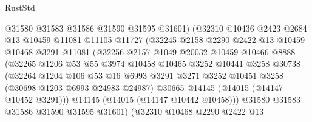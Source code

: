 \begin{lexlean}{RustStd}
\begin{coremodule}
                          @31580
                          @31583
                          @31586
                          @31590
                          @31595
                          @31601)
                        (@32310
                          @10436
                          @2423
                          @2684
                          @13
                          @10459
                          @11081
                          @11105
                          @11727
                          (@32245
                            @2158
                            @2290
                            @2422
                            @13
                            @10459
                            @10468
                            @3291
                            @11081
                            (@32256
                              @2157
                              @1049
                              @20032
                              @10459
                              @10466
                              @8888
                              (@32265
                                @1206
                                @53
                                @55
                                @3974
                                @10458
                                @10465
                                @3252
                                @10441
                                @3258
                                @30738
                                (@32264
                                  @1204
                                  @106
                                  @53
                                  @16
                                  @6993
                                  @3291
                                  @3271
                                  @3252
                                  @10451
                                  @3258
                                  (@30698 @1203 @6993 @24983 @24987)
                                  @30665
                                  @14145
                                  (@14015 (@14147 @10452 @3291)))
                                @14145
                                (@14015 (@14147 @10442 @10458)))
                              @31580
                              @31583
                              @31586
                              @31590
                              @31595
                              @31601)
                            (@32310
                              @10468
                              @2290
                              @2422
                              @13

\end{coremodule}
\end{lexlean}
